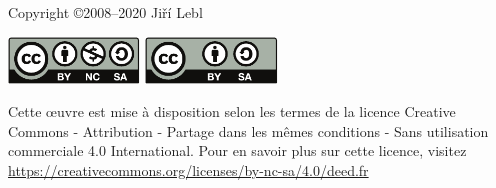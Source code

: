 \documentclass[12pt]{book}
\begin{document}

\newcommand{\theversion}{6.1}
\makediffytitlepage

\newpage

\vspace*{\fill}

\begin{small}
%
%
\noindent
Copyright \copyright 2008--2020 Ji\v{r}\'i Lebl



\bigskip

\noindent
\includegraphics[width=1.38in]{figures/license}
\quad
\includegraphics[width=1.38in]{figures/license2}

\bigskip

\noindent

Cette {\oe}uvre est mise à disposition selon les termes de la licence Creative Commons - Attribution - Partage dans les mêmes conditions - Sans utilisation commerciale 4.0 International.
Pour en savoir plus sur cette licence, visitez
\url{https://creativecommons.org/licenses/by-nc-sa/4.0/deed.fr}


\end{small}
\end{document}
